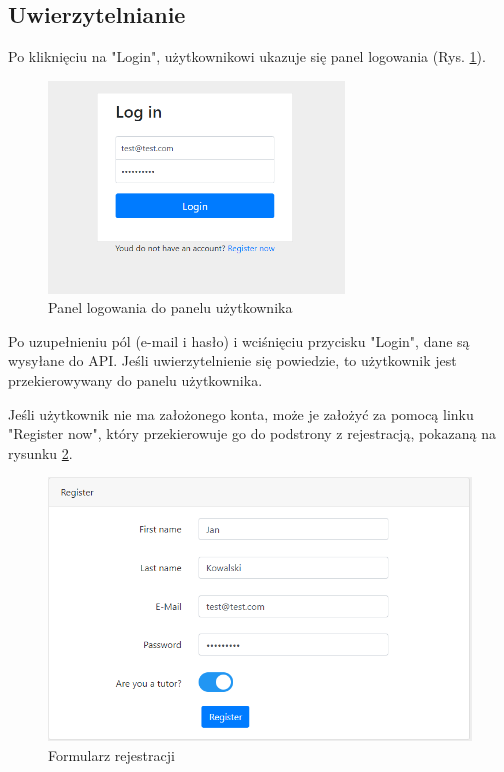 \documentclass[12pt]{article}
\numberwithin{figure}{section}
\begin{document}
\begin{sloppypar}
\subsection{Uwierzytelnianie}
Po kliknięciu na "Login", użytkownikowi ukazuje się panel logowania (Rys. \ref{fig:login}). 

\begin{figure}[!htbp] 
    \centering
    \includegraphics[width=0.7\textwidth]{images/chapter_4/login.png}
    \caption{Panel logowania do panelu użytkownika}
    \label{fig:login}
\end{figure}

Po uzupełnieniu pól (e-mail i hasło) i wciśnięciu przycisku "Login", dane są wysyłane do API. Jeśli uwierzytelnienie się powiedzie, to użytkownik jest przekierowywany do panelu użytkownika.

Jeśli użytkownik nie ma założonego konta, może je założyć za pomocą linku "Register now", który przekierowuje go do podstrony z rejestracją, pokazaną na rysunku \ref{fig:register}.

\begin{figure}[!htbp] 
    \centering
    \includegraphics[width=1\textwidth]{images/chapter_4/register.png}
    \caption{Formularz rejestracji}
    \label{fig:register}
\end{figure}


\end{sloppypar}
\end{document}
